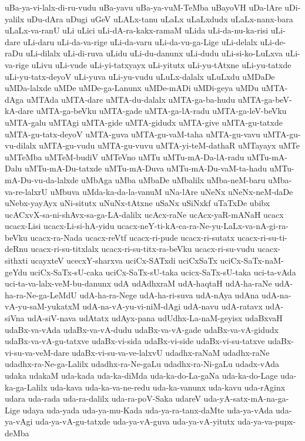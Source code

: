 {uBa-ya-vi-lalx-di-ru-vudu
uBa-yavu
uBa-ya-vuM-TeMba
uBayoVH
uDa-lAre
uDi-yalilx
uDu-dAra
uDugi
uGeV
uLALx-tanu
uLaLx
uLaLxdudx
uLaLx-nanx-bara
uLaLx-va-ranU
uLi
uLici
uLi-dA-ra-kakx-ramaM
uLida
uLi-da-nu-ka-risi
uLi-dare
uLi-daru
uLi-da-va-rige
uLi-da-varu
uLi-da-vu-ga-Lige
uLi-delalx
uLi-de-raDu
uLi-dilalx
uLi-di-ruva
uLidu
uLi-du-danunx
uLi-dudu
uLi-si-ko-LuLxva
uLi-va-rige
uLivu
uLi-vude
uLi-yi-tatxyayx
uLi-yitutx
uLi-yu-tAtxne
uLi-yu-tatxde
uLi-yu-tatx-deyoV
uLi-yuva
uLi-yu-vudu
uLuLx-dalalx
uLuLxdu
uMDaDe
uMDa-lalxde
uMDe
uMDe-ga-Lanunx
uMDe-mADi
uMDi-geya
uMDu
uMTA-dAga
uMTAda
uMTA-dare
uMTA-du-dalalx
uMTA-ga-ba-hudu
uMTA-ga-beV-kA-dare
uMTA-ga-beVku
uMTA-gade
uMTA-ga-lA-radu
uMTA-ga-leV-beVku
uMTA-galu
uMTAgi
uMTA-gide
uMTA-gidudx
uMTA-give
uMTA-gu-tatxde
uMTA-gu-tatx-deyoV
uMTA-guva
uMTA-gu-vaM-taha
uMTA-gu-vavu
uMTA-gu-vu-dilalx
uMTA-gu-vudu
uMTA-gu-vuvu
uMTA-yi-teM-dathaR
uMTayayx
uMTe
uMTeMba
uMTeM-budiV
uMTeVno
uMTu
uMTu-mA-Da-lA-radu
uMTu-mA-Dalu
uMTu-mA-Du-tatxde
uMTu-mA-Duva
uMTu-mA-Du-vaM-ta-hadu
uMTu-mA-Du-vu-da-lalxde
uMbAga
uMba
uMbaDe
uMbalilx
uMba-neM-baru
uMba-va-re-lalxrU
uMbuva
uMda-ka-da-la-vanuM
uNa-lAre
uNeNx
uNeNx-neM-daDe
uNebx-yayAyx
uNi-situtx
uNuNx-tAtxne
uSaNx
uSiNxkf
uTaTxDe
ubibx
ucACxvX-sa-ni-shAvx-sa-ga-LA-dalilx
ucAcx-raNe
ucAcx-yaR-mANaH
ucacx
ucacx-Lisi
ucacx-Li-si-hA-yidu
ucacx-neY-ti-kA-ca-ra-Ne-yu-LaLx-va-nA-gi-ra-beVku
ucacx-ra-Nada
ucacx-reVtf
ucacx-ri-pude
ucacx-ri-sutatx
ucacx-ri-su-ti-deRnu
ucacx-ri-su-titxlalx
ucacx-ri-su-titx-ra-beVku
ucacx-ri-su-vudu
ucacx-sithxti
ucayxteV
ucecxY-sharxva
uciCx-SATxdi
uciCxSaTx
uciCx-SaTx-naM-geYdu
uciCx-SaTx-sU-caka
uciCx-SaTx-sU-taka
ucicx-SaTx-sU-taka
uci-ta-vAda
uci-ta-va-lalx-veM-bu-danunx
udA
udAdhxraM
udA-haqtaH
udA-ha-raNe
udA-ha-ra-Ne-ga-LeMdU
udA-ha-ra-Nege
udA-ha-ri-suva
udA-nAya
udAna
udA-na-vA-yu-saM-yukatxM
udA-na-vA-yu-vi-niM-dAgi
udA-navu
udA-ratavx
udA-siVna
udA-siV-nava
udAtatx
udAyx-pana
udUdhx-La-naM-geyisx
udaBxvaH
udaBx-va-vAda
udaBx-va-vA-dudu
udaBx-va-vA-gade
udaBx-va-vA-gidudx
udaBx-va-vA-gu-tatxve
udaBx-vi-sida
udaBx-vi-side
udaBx-vi-su-tatxve
udaBx-vi-su-va-veM-dare
udaBx-vi-su-va-ve-lalxvU
udadhx-raNaM
udadhx-raNe
udadhx-ra-Ne-ga-Lalilx
udadhx-ra-Ne-gaLu
udadhx-ra-Ni-gaLu
udadx-vAda
udaka
udakaM
uda-kada
uda-ka-diMda
uda-ka-do-La-gaNa
uda-ka-do-Lage
uda-ka-ga-Lalilx
uda-kava
uda-ka-va-ne-redu
uda-ka-vanunx
uda-kavu
uda-rAginx
udara
uda-rada
uda-ra-dalilx
uda-ra-poV-Saka
udareV
uda-yA-satx-mA-na-ga-Lige
udaya
uda-yada
uda-ya-mu-Kada
uda-ya-ra-tanx-daMte
uda-ya-vAda
uda-ya-vAgi
uda-ya-vA-gu-tatxde
uda-ya-vA-guva
uda-ya-vA-yitutx
uda-ya-va-pupx-deMba
}
